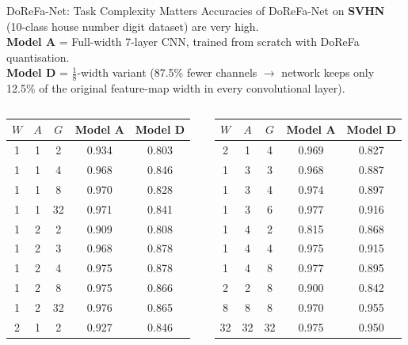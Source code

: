 \documentclass[aspectratio=169]{beamer} %
\begin{document}
\begin{frame}{DoReFa-Net: Task Complexity Matters}
  Accuracies of DoReFa-Net on \textbf{SVHN} (10-class house number digit dataset) are very high.\\
  \textbf{Model A} = Full-width 7-layer CNN, trained from scratch with DoReFa quantisation.\\
  \textbf{Model D} = $\frac{1}{8}$-width variant (87.5\% fewer channels $\rightarrow$ network keeps only 12.5\% of the original feature-map width in every convolutional layer). %
  \vspace{0.3cm}

  \renewcommand{\arraystretch}{0.85}
  \centering
  \begin{columns}[T,onlytextwidth]
    \begin{tabular}{ccc cc}
      \toprule
      $W$ & $A$ & $G$ & Model A & Model D \\
      \midrule
      1   & 1   & 2   & 0.934   & 0.803   \\
      1   & 1   & 4   & 0.968   & 0.846   \\
      1   & 1   & 8   & 0.970   & 0.828   \\
      1   & 1   & 32  & 0.971   & 0.841   \\
      1   & 2   & 2   & 0.909   & 0.808   \\
      1   & 2   & 3   & 0.968   & 0.878   \\
      1   & 2   & 4   & 0.975   & 0.878   \\
      1   & 2   & 8   & 0.975   & 0.866   \\
      1   & 2   & 32  & 0.976   & 0.865   \\
      2   & 1   & 2   & 0.927   & 0.846   \\
      \bottomrule
    \end{tabular}

    \begin{tabular}{ccc cc}
      \toprule
      $W$ & $A$ & $G$ & Model A & Model D \\
      \midrule
      2   & 1   & 4   & 0.969   & 0.827   \\
      1   & 3   & 3   & 0.968   & 0.887   \\
      1   & 3   & 4   & 0.974   & 0.897   \\
      1   & 3   & 6   & 0.977   & 0.916   \\
      1   & 4   & 2   & 0.815   & 0.868   \\
      1   & 4   & 4   & 0.975   & 0.915   \\
      1   & 4   & 8   & 0.977   & 0.895   \\
      2   & 2   & 8   & 0.900   & 0.842   \\
      8   & 8   & 8   & 0.970   & 0.955   \\
      32  & 32  & 32  & 0.975   & 0.950   \\
      \bottomrule
    \end{tabular}
  \end{columns}
\end{frame}
\end{document}
